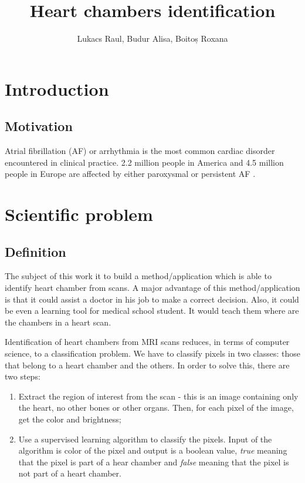 \documentclass[12pt]{report}
\title{\textbf{Heart chambers identification}}
\author{Lukacs Raul, Budur Alisa, Boitoș Roxana}
\begin{document}
\maketitle
\setlength{\parindent}{1cm}

\begin{abstract}

\end{abstract}
\tableofcontents{}

\chapter{Introduction}
\section{Motivation}
Atrial fibrillation (AF) or arrhythmia is the most common cardiac disorder encountered in clinical practice. 2.2 million people in America and 4.5 million people in Europe are affected by either paroxysmal or persistent AF \cite{sankaranarayanan1}. 

\chapter{Scientific problem}
\section{Definition}
The subject of this work it to build a method/application which is able to identify heart chamber from scans. A major advantage of this method/application is that it could assist a doctor in his job to make a correct decision. Also, it could be even a learning tool for medical school student. It would teach them where are the chambers in a heart scan.

Identification of heart chambers from MRI scans reduces, in terms of computer science, to a classification problem. We have to classify pixels in two classes: those that belong to a heart chamber and the others.  In order to solve this, there are two steps:

\begin{enumerate}
	\item Extract the region of interest from the scan - this is an image containing only the heart, no other bones or other organs. Then, for each pixel of the image, get the color and brightness;
	\item  Use a supervised learning algorithm to classify the pixels. Input of the algorithm is color of the pixel and output is a boolean value, \textit{true} meaning that the pixel is part of a hear chamber and  \textit{false} meaning that the pixel is not part of a heart chamber.
\end{enumerate}
\end{document}
